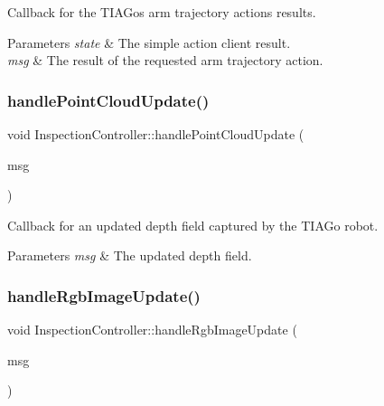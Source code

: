 Callback for the T\+I\+A\+Go\textquotesingle{}s arm trajectory action\textquotesingle{}s results. 
\begin{DoxyParams}{Parameters}
{\em state} & The simple action client result. \\
\hline
{\em msg} & The result of the requested arm trajectory action. \\
\hline
\end{DoxyParams}
\mbox{\label{classInspectionController_a0be5ef625b1ef85a9bbc3aed29436d31}} 
\subsubsection{\texorpdfstring{handle\+Point\+Cloud\+Update()}{handlePointCloudUpdate()}}
{\footnotesize\ttfamily void Inspection\+Controller\+::handle\+Point\+Cloud\+Update (\begin{DoxyParamCaption}\item[{const sensor\+\_\+msgs\+::\+Point\+Cloud2\+Const\+Ptr \&}]{msg }\end{DoxyParamCaption})}

Callback for an updated depth field captured by the T\+I\+A\+Go robot. 
\begin{DoxyParams}{Parameters}
{\em msg} & The updated depth field. \\
\hline
\end{DoxyParams}
\mbox{\label{classInspectionController_af63cab2f6a58cea872a5114fc12a184f}} 
\subsubsection{\texorpdfstring{handle\+Rgb\+Image\+Update()}{handleRgbImageUpdate()}}
{\footnotesize\ttfamily void Inspection\+Controller\+::handle\+Rgb\+Image\+Update (\begin{DoxyParamCaption}\item[{const sensor\+\_\+msgs\+::\+Image\+Const\+Ptr \&}]{msg }\end{DoxyParamCaption})}

